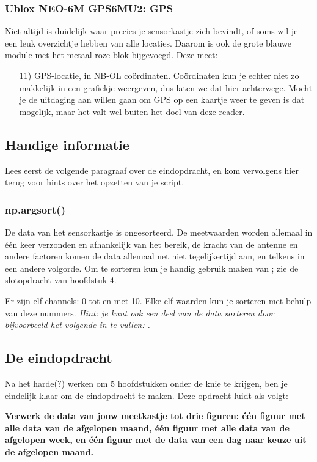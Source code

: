 \documentclass[a4paper,11pt, fleqn]{article}
\begin{document}
\subsubsection{Ublox NEO-6M GPS6MU2: GPS}
Niet altijd is duidelijk waar precies je sensorkastje zich bevindt, of soms wil je een leuk overzichtje hebben van alle locaties. Daarom is ook de grote blauwe module met het metaal-roze blok bijgevoegd. Deze meet:
\begin{itemize}
	\item[11)] GPS-locatie, in NB-OL co\"ordinaten. Co\"ordinaten kun je echter niet zo makkelijk in een grafiekje weergeven, dus laten we dat hier achterwege. Mocht je de uitdaging aan willen gaan om GPS op een kaartje weer te geven is dat mogelijk, maar het valt wel buiten het doel van deze reader.
\end{itemize}

\subsection{Handige informatie}
Lees eerst de volgende paragraaf over de eindopdracht, en kom vervolgens hier terug voor hints over het opzetten van je script.

\subsubsection*{np.argsort()}
De data van het sensorkastje is ongesorteerd. De meetwaarden worden allemaal in \'e\'en keer verzonden en afhankelijk van het bereik, de kracht van de antenne en andere factoren komen de data allemaal net niet tegelijkertijd aan, en telkens in een andere volgorde. Om te sorteren kun je handig gebruik maken van ; zie de slotopdracht van hoofdstuk 4.

Er zijn elf channels: 0 tot en met 10. Elke elf waarden kun je sorteren met behulp van deze nummers. {\it Hint: je kunt ook een deel van de data sorteren door bijvoorbeeld het volgende in te vullen: .}

\subsection{De eindopdracht}
Na het harde(?) werken om 5 hoofdstukken onder de knie te krijgen, ben je eindelijk klaar om de eindopdracht te maken. Deze opdracht luidt als volgt: 

{\bf Verwerk de data van jouw meetkastje tot drie figuren: \'e\'en figuur met alle data van de afgelopen maand, \'e\'en figuur met alle data van de afgelopen week, en \'e\'en figuur met de data van een dag naar keuze uit de afgelopen maand.}
\end{document}
